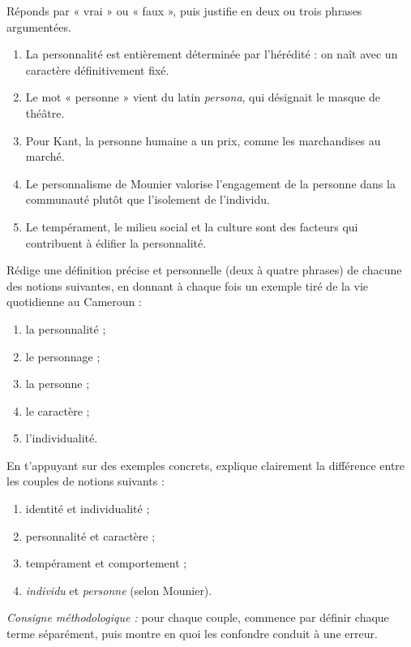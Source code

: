 \documentclass[11pt]{article}
\newcommand{\cle}[1]{{\popxbold\color{popdark}#1}}
\begin{document}
\begin{exercice}
Réponds par « vrai » ou « faux », puis justifie en deux ou trois phrases argumentées.
\begin{enumerate}
\item La personnalité est entièrement déterminée par l'hérédité : on naît avec un caractère définitivement fixé.
\item Le mot « personne » vient du latin \emph{persona}, qui désignait le masque de théâtre.
\item Pour Kant, la personne humaine a un prix, comme les marchandises au marché.
\item Le personnalisme de Mounier valorise l'engagement de la personne dans la communauté plutôt que l'isolement de l'individu.
\item Le tempérament, le milieu social et la culture sont des facteurs qui contribuent à édifier la personnalité.
\end{enumerate}
\end{exercice}

\begin{exercice}
Rédige une définition précise et personnelle (deux à quatre phrases) de chacune des notions suivantes, en donnant à chaque fois un exemple tiré de la vie quotidienne au Cameroun :
\begin{enumerate}
\item la \cle{personnalité} ;
\item le \cle{personnage} ;
\item la \cle{personne} ;
\item le \cle{caractère} ;
\item l'\cle{individualité}.
\end{enumerate}
\end{exercice}

\begin{exercice}
En t'appuyant sur des exemples concrets, explique clairement la différence entre les couples de notions suivants :
\begin{enumerate}
\item \cle{identité} et \cle{individualité} ;
\item \cle{personnalité} et \cle{caractère} ;
\item \cle{tempérament} et \cle{comportement} ;
\item \emph{individu} et \emph{personne} (selon Mounier).
\end{enumerate}
\emph{Consigne méthodologique :} pour chaque couple, commence par définir chaque terme séparément, puis montre en quoi les confondre conduit à une erreur.
\end{exercice}
\end{document}
